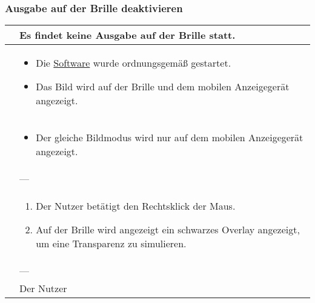 \subsubsection{Ausgabe auf der Brille deaktivieren}
\begin{center}
	\begin{longtable}{| p{3cm} | p{12cm} |}
		\hline
		\goal & Es findet keine Ausgabe auf der Brille statt. \\ \hline
		
		\precondition & \begin{itemize}
			\item Die \hyperlink{tab:anwendung}{Software} wurde ordnungsgemäß gestartet.
			\item Das Bild wird auf der Brille und dem mobilen Anzeigegerät angezeigt.
		\end{itemize} \\ \hline
		
		\postcondition & \begin{itemize}
			\item Der gleiche Bildmodus wird nur auf dem mobilen Anzeigegerät angezeigt.
		\end{itemize} \\ \hline
		
		\postexception & --- \\ \hline
		
		\flow & \begin{enumerate}
			\item Der Nutzer betätigt den Rechtsklick der Maus.
			\item Auf der Brille wird angezeigt ein schwarzes Overlay angezeigt, um eine Transparenz zu simulieren.			
		\end{enumerate} \\ \hline
		
		\exception & --- \\ \hline
		
		\player & Der Nutzer \\
		\hline
	\end{longtable}
\end{center}

